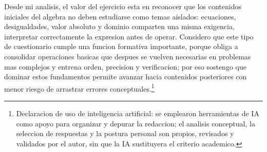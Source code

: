 \documentclass[
	spanish,
	letterpaper, oneside
]{article}
\begin{document}
Desde mi analisis, el valor del ejercicio esta en reconocer que los contenidos iniciales del algebra no deben estudiarse como temas aislados: ecuaciones, desigualdades, valor absoluto y dominio comparten una misma exigencia, interpretar correctamente la expresion antes de operar. Considero que este tipo de cuestionario cumple una funcion formativa importante, porque obliga a consolidar operaciones basicas que despues se vuelven necesarias en problemas mas complejos y entrena orden, precision y verificacion; por eso sostengo que dominar estos fundamentos permite avanzar hacia contenidos posteriores con menor riesgo de arrastrar errores conceptuales.\footnote{Declaracion de uso de inteligencia artificial: se emplearon herramientas de IA como apoyo para organizar y depurar la redaccion; el analisis conceptual, la seleccion de respuestas y la postura personal son propios, revisados y validados por el autor, sin que la IA sustituyera el criterio academico.}


\clearpage


\end{document}
